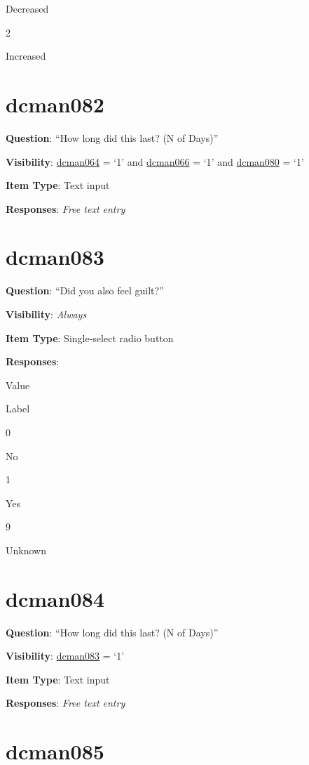 \documentclass[]{book}
\begin{document}
Decreased

2

Increased

\hypertarget{dcman082}{%
\section{dcman082}\label{dcman082}}

\textbf{Question}: ``How long did this last? (N of Days)''

\textbf{Visibility}: \protect\hyperlink{dcman064}{dcman064} = `1' and \protect\hyperlink{dcman066}{dcman066} = `1' and \protect\hyperlink{dcman080}{dcman080} = `1'

\textbf{Item Type}: Text input

\textbf{Responses}: \emph{Free text entry}

\hypertarget{dcman083}{%
\section{dcman083}\label{dcman083}}

\textbf{Question}: ``Did you also feel guilt?''

\textbf{Visibility}: \emph{Always}

\textbf{Item Type}: Single-select radio button

\textbf{Responses}:

Value

Label

0

No

1

Yes

9

Unknown

\hypertarget{dcman084}{%
\section{dcman084}\label{dcman084}}

\textbf{Question}: ``How long did this last? (N of Days)''

\textbf{Visibility}: \protect\hyperlink{dcman083}{dcman083} = `1'

\textbf{Item Type}: Text input

\textbf{Responses}: \emph{Free text entry}

\hypertarget{dcman085}{%
\section{dcman085}\label{dcman085}}
\end{document}
